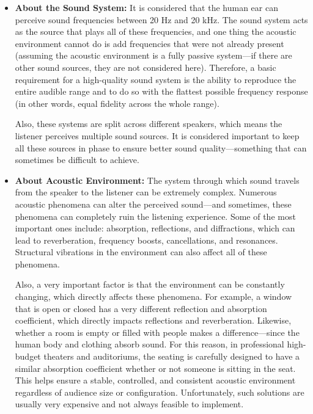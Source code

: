 \begin{itemize}
	\item \textbf{About the Sound System:} It is considered that the human ear can perceive sound frequencies between 20 Hz and 20 kHz. The sound system acts as the source that plays all of these frequencies, and one thing the acoustic environment cannot do is add frequencies that were not already present (assuming the acoustic environment is a fully passive system—if there are other sound sources, they are not considered here). Therefore, a basic requirement for a high-quality sound system is the ability to reproduce the entire audible range and to do so with the flattest possible frequency response (in other words, equal fidelity across the whole range).
	
	Also, these systems are split across different speakers, which means the listener perceives multiple sound sources. It is considered important to keep all these sources in phase to ensure better sound quality—something that can sometimes be difficult to achieve.
	
	\item \textbf{About Acoustic Environment:} The system through which sound travels from the speaker to the listener can be extremely complex. Numerous acoustic phenomena can alter the perceived sound—and sometimes, these phenomena can completely ruin the listening experience. Some of the most important ones include: absorption, reflections, and diffractions, which can lead to reverberation, frequency boosts, cancellations, and resonances. Structural vibrations in the environment can also affect all of these phenomena.
	
	Also, a very important factor is that the environment can be constantly changing, which directly affects these phenomena. For example, a window that is open or closed has a very different reflection and absorption coefficient, which directly impacts reflections and reverberation. Likewise, whether a room is empty or filled with people makes a difference—since the human body and clothing absorb sound. For this reason, in professional high-budget theaters and auditoriums, the seating is carefully designed to have a similar absorption coefficient whether or not someone is sitting in the seat. This helps ensure a stable, controlled, and consistent acoustic environment regardless of audience size or configuration. Unfortunately, such solutions are usually very expensive and not always feasible to implement. 
\end{itemize}

